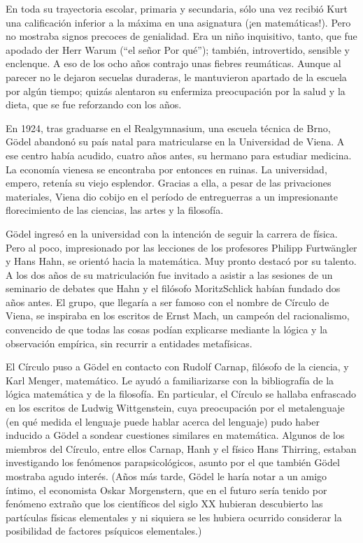 \documentclass[a4paper, 12pt]{article}
\begin{document}
En toda su trayectoria escolar, primaria y secundaria, sólo una vez recibió Kurt una calificación inferior a la máxima en una asignatura (¡en matemáticas!). Pero no mostraba signos precoces de genialidad. Era un niño inquisitivo, tanto, que fue apodado der Herr Warum (``el señor Por qué''); también, introvertido, sensible y enclenque. A eso de los ocho años contrajo unas fiebres reumáticas. Aunque al parecer no le dejaron secuelas duraderas, le mantuvieron apartado de la escuela por algún tiempo; quizás alentaron su enfermiza preocupación por la salud y la dieta, que se fue reforzando con los años.

En 1924, tras graduarse en el Realgymnasium, una escuela técnica de Brno, Gödel abandonó su país natal para matricularse en la Universidad de Viena. A ese centro había acudido, cuatro años antes, su hermano para estudiar medicina. La economía vienesa se encontraba por entonces en ruinas. La universidad, empero, retenía su viejo esplendor. Gracias a ella, a pesar de las privaciones materiales, Viena dio cobijo en el período de entreguerras a un impresionante florecimiento de las ciencias, las artes y la filosofía.

Gödel ingresó en la universidad con la intención de seguir la carrera de física. Pero al poco, impresionado por las lecciones de los profesores Philipp Furtwängler y Hans Hahn, se orientó hacia la matemática. Muy pronto destacó por su talento. A los dos años de su matriculación fue invitado a asistir a las sesiones de un seminario de debates que Hahn y el filósofo Moritz\linebreak Schlick habían fundado dos años antes. El grupo, que llegaría a ser famoso con el nombre de Círculo de Viena, se inspiraba en los escritos de Ernst Mach, un campeón del racionalismo, convencido de que todas las cosas podían explicarse mediante la lógica y la observación empírica, sin recurrir a entidades metafísicas.

El Círculo puso a Gödel en contacto con Rudolf Carnap, filósofo de la ciencia, y Karl Menger, matemático. Le ayudó a familiarizarse con la bibliografía de la lógica matemática y de la filosofía. En particular, el Círculo se hallaba enfrascado en los escritos de Ludwig Wittgenstein, cuya preocupación por el metalenguaje (en qué medida el lenguaje puede hablar acerca del lenguaje) pudo haber inducido a Gödel a sondear cuestiones similares en matemática. Algunos de los miembros del Círculo, entre ellos Carnap, Hanh y el físico Hans Thirring, estaban investigando los fenómenos parapsicológicos, asunto por el que también Gödel mostraba agudo interés. (Años más tarde, Gödel le haría notar a un amigo íntimo, el economista Oskar Morgenstern, que en el futuro sería tenido por fenómeno extraño que los científicos del siglo XX hubieran descubierto las partículas físicas elementales y ni siquiera se les hubiera ocurrido considerar la posibilidad de factores psíquicos elementales.)
\end{document}
